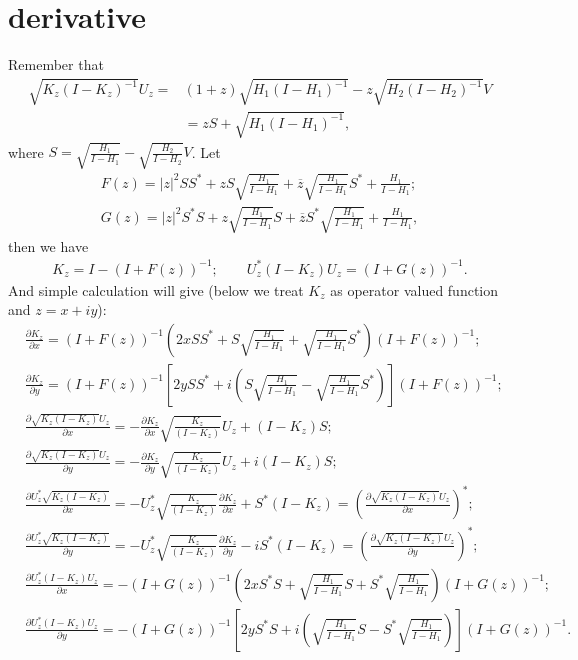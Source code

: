 \documentclass{amsart}
\begin{document}
\section{derivative}
Remember that
\begin{align*}
\sqrt{K_{z}(I-K_{z})^{-1}}U_{z} = &(1+z)\sqrt{H_{1}(I-H_{1})^{-1}}-
                                   z\sqrt{H_{2}(I-H_{2})^{-1}}V \\
                                 &=zS + \sqrt{H_{1}(I-H_{1})^{-1}},
\end{align*}
where $S = \sqrt{\frac{H_1}{I - H_1}} - \sqrt{\frac{H_2}{I - H_2}}V$.
Let
\begin{align*}
F(z) = |z|^{2}SS^{*} + zS\sqrt{\frac{H_1}{I - H_1}} + \overline{z}\sqrt{\frac{H_1}{I - H_1}}S^{*} + \frac{H_1}{I - H_1};\\
G(z) = |z|^{2}S^{*}S + z\sqrt{\frac{H_1}{I - H_1}}S + \overline{z}S^{*}\sqrt{\frac{H_1}{I - H_1}} + \frac{H_1}{I - H_1},
\end{align*}
then we have
\begin{align*}
K_{z} = I - (I + F(z))^{-1}; \qquad
U_{z}^{*}(I - K_z)U_{z} = (I + G(z))^{-1}.
\end{align*}
And simple calculation will give (below we treat $K_{z}$ as operator valued function and $z = x + iy$):
\begin{align*}
&\frac{\partial K_{z}}{\partial x} = (I + F(z))^{-1}(2xSS^{*} + S\sqrt{\frac{H_1}{I - H_1}} + \sqrt{\frac{H_1}{I - H_1}}S^{*})(I + F(z))^{-1};\\
&\frac{\partial K_{z}}{\partial y} = (I + F(z))^{-1}[2ySS^{*} + i(S\sqrt{\frac{H_1}{I - H_1}} - \sqrt{\frac{H_1}{I - H_1}}S^{*})](I + F(z))^{-1};\\
&\frac{\partial \sqrt{K_{z}(I-K_z)}U_z}{\partial x} = - \frac{\partial K_{z}}{\partial x}\sqrt{\frac{K_{z}}{(I-K_{z})}}U_{z} + (I - K_z)S;\\
&\frac{\partial \sqrt{K_{z}(I-K_z)}U_z}{\partial y} = - \frac{\partial K_{z}}{\partial y}\sqrt{\frac{K_{z}}{(I-K_{z})}}U_{z} + i(I - K_z)S;\\
&\frac{\partial U_{z}^{*}\sqrt{K_{z}(I-K_z)}}{\partial x} = - U_{z}^{*}\sqrt{\frac{K_{z}}{(I-K_{z})}}\frac{\partial K_{z}}{\partial x} + S^{*}(I - K_z) = (\frac{\partial \sqrt{K_{z}(I-K_z)}U_z}{\partial x})^{*};\\
&\frac{\partial U_{z}^{*}\sqrt{K_{z}(I-K_z)}}{\partial y} = - U_{z}^{*}\sqrt{\frac{K_{z}}{(I-K_{z})}}\frac{\partial K_{z}}{\partial y} - iS^{*}(I - K_z) = (\frac{\partial \sqrt{K_{z}(I-K_z)}U_z}{\partial y})^{*};\\
&\frac{\partial U_{z}^{*}(I - K_{z})U_{z}}{\partial x} = -(I + G(z))^{-1}(2xS^{*}S + \sqrt{\frac{H_1}{I - H_1}}S + S^{*}\sqrt{\frac{H_1}{I - H_1}})(I + G(z))^{-1};\\
&\frac{\partial U_{z}^{*}(I - K_{z})U_{z}}{\partial y} = -(I + G(z))^{-1}[2yS^{*}S + i(\sqrt{\frac{H_1}{I - H_1}}S - S^{*}\sqrt{\frac{H_1}{I - H_1}})](I + G(z))^{-1}.\\
\end{align*}
\end{document}
